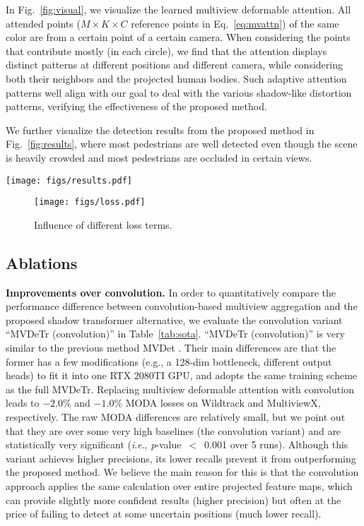 \documentclass[sigconf,authorversion,nonacm]{acmart}
\newcommand{\ie}{\textit{i}.\textit{e}.}
\begin{document}
In Fig.~\ref{fig:visual}, we visualize the learned multiview deformable attention. All attended points ($M \times K \times C$ reference points in Eq.~\ref{eq:mvattn}) of the same color are from a certain point of a certain camera. When considering the points that contribute mostly (in each circle), we find that the attention displays distinct patterns at different positions and different camera, while considering both their neighbors and the projected human bodies. Such adaptive attention patterns well align with our goal to deal with the various shadow-like distortion patterns, verifying the effectiveness of the proposed method. 

We further visualize the detection results from the proposed method in Fig.~\ref{fig:results}, where most pedestrians are well detected even though the scene is heavily crowded and most pedestrians are occluded in certain views. 


\begin{figure*}[h]
  \centering
  \texttt{[image: figs/results.pdf]}
  \caption{Detection result visualization of the proposed method. 
  }
  \label{fig:results}
\end{figure*}


\begin{figure}[h]
  \centering
  \texttt{[image: figs/loss.pdf]}
  \caption{Influence of different loss terms.
  }
  \label{fig:loss}
\end{figure}



\subsection{Ablations}
\label{secsec:ablations}

\textbf{Improvements over convolution.}
In order to quantitatively compare the performance difference between convolution-based multiview aggregation and the proposed shadow transformer alternative, we evaluate the convolution variant ``MVDeTr (convolution)'' in Table~\ref{tab:sota}. ``MVDeTr (convolution)'' is very similar to the previous method MVDet \cite{hou2020multiview}. Their main differences are that the former has a few modifications (e.g., a 128-dim bottleneck, different output heads) to fit it into one RTX 2080TI GPU, and adopts the same training scheme as the full MVDeTr. 
Replacing multiview deformable attention with convolution leads to $-2.0\%$ and $-1.0\%$ MODA losses on Wildtrack and MultiviewX, respectively. The raw MODA differences are relatively small, but we point out that they are over some very high baselines (the convolution variant) and are statistically very significant (\ie, \textit{p}-value~$<$~0.001 over 5 runs). 
Although this variant achieves higher precisions, its lower recalls prevent it from outperforming the proposed method. We believe the main reason for this is that the convolution approach applies the same calculation over entire projected feature maps, which can provide slightly more confident results (higher precision) but often at the price of failing to detect at some uncertain positions (much lower recall). 
\end{document}

